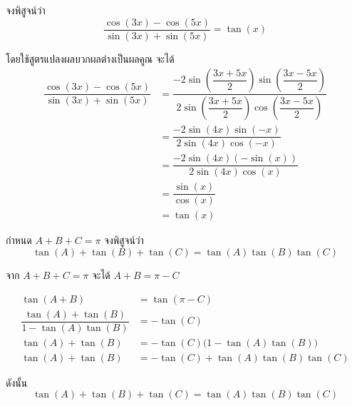\newpage
\begin{examplebox}
	จงพิสูจน์ว่า 
	\[
	\dfrac{\cos(3x) - \cos(5x)}{\sin(3x) + \sin(5x)} = \tan(x)
	\]
\end{examplebox}

\proof โดยใช้สูตรแปลงผลบวกผลต่างเป็นผลคูณ จะได้
$$
\begin{aligned}
	\dfrac{\cos(3x) - \cos(5x)}{\sin(3x) + \sin(5x)}
	&= \dfrac{-2 \sin\left(\dfrac{3x + 5x}{2}\right)\sin\left(\dfrac{3x - 5x}{2}\right)}
	{2 \sin\left(\dfrac{3x + 5x}{2}\right)\cos\left(\dfrac{3x - 5x}{2}\right)} \\
	&= \dfrac{-2 \sin(4x)\sin(-x)}{2 \sin(4x)\cos(-x)} \\
	&= \dfrac{-2 \sin(4x)(-\sin(x))}{2 \sin(4x)\cos(x)} \\
	&= \dfrac{\sin(x)}{\cos(x)} \\
	&= \tan(x)
\end{aligned}
$$

\begin{examplebox}
	กำหนด \(A + B + C = \pi\) จงพิสูจน์ว่า 
	\[
	\tan(A) + \tan(B) + \tan(C) = \tan(A)\tan(B)\tan(C)
	\]
\end{examplebox}

\proof จาก \(A + B + C = \pi\) จะได้ \(A + B = \pi - C\)

$$
\begin{aligned}
	\tan(A + B) &= \tan(\pi - C) \\
	\dfrac{\tan(A) + \tan(B)}{1 - \tan(A)\tan(B)} &= -\tan(C) \\
	\tan(A) + \tan(B) &= -\tan(C)\bigl(1 - \tan(A)\tan(B)\bigr) \\
	\tan(A) + \tan(B) &= -\tan(C) + \tan(A)\tan(B)\tan(C)
\end{aligned}
$$

ดังนั้น
\[
\tan(A) + \tan(B) + \tan(C) = \tan(A)\tan(B)\tan(C)
\]

\newpage
